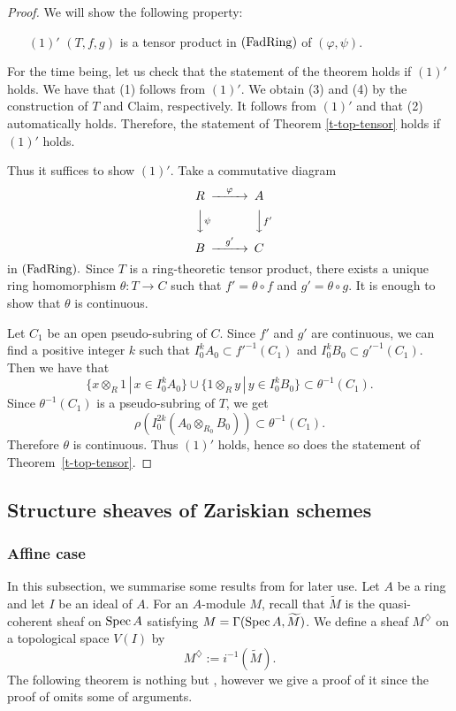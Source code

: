 \begin{proof}
We will show the following property: 
\begin{enumerate}
\item[$(1)'$] $(T, f, g)$ is a tensor product in $({\rm FadRing})$ of $(\varphi, \psi)$. 
\end{enumerate}

For the time being, 
let us check that the statement of the theorem holds if $(1)'$ holds. 
We have that (1) follows from $(1)'$. 
We obtain (3) and (4) by the construction of $T$ and Claim, respectively. 
It follows from $(1)'$ and \cite[Corollary 1.9(ii)]{Hub93} that (2) automatically holds. 
Therefore, the statement of Theorem \ref{t-top-tensor} holds if $(1)'$ holds. 

\medskip 

Thus it suffices to show $(1)'$. 
Take a commutative diagram 
$$\begin{CD}
R @>\varphi >> A\\
@VV\psi V @VVf'V\\
B @>g'>> C 
\end{CD}$$
in $({\rm FadRing}).$ 
Since $T$ is a ring-theoretic tensor product, 
there exists a unique ring homomorphism $\theta:T \to C$ 
such that $f'=\theta \circ f$ and $g'=\theta \circ g$. 
It is enough to show that $\theta$ is continuous. 

Let $C_1$ be an open pseudo-subring of $C$. 
Since $f'$ and $g'$ are continuous, 
we can find a positive integer $k$ such that 
$I_0^kA_0 \subset f'^{-1}(C_1)$ and $I_0^kB_0 \subset g'^{-1}(C_1)$. 
Then we have that 
$$\{x \otimes_R 1\,|\, x \in I_0^kA_0\} \cup 
\{1 \otimes_R y\,|\, y \in I_0^kB_0\} \subset \theta^{-1}(C_1).$$ 
Since $\theta^{-1}(C_1)$ is a pseudo-subring of $T$, 
we get 
$$\rho(I_0^{2k}(A_0 \otimes_{R_0} B_0)) \subset \theta^{-1}(C_1).$$ 
Therefore $\theta$ is continuous. 
Thus $(1)'$ holds, 
hence so does the statement of Theorem~\ref{t-top-tensor}. 
\end{proof}




\subsection{Structure sheaves of Zariskian schemes}

\subsubsection{Affine case}\label{ss-FK-affine}

In this subsection, we summarise some results from \cite{FK} for later use. 
Let $A$ be a ring and let $I$ be an ideal of $A$. 
For an $A$-module $M$, recall that $\widetilde M$ 
is the quasi-coherent sheaf on ${\operatorname{Spec}}\,A$ satisfying 
$M=\Gamma({\operatorname{Spec}}\,A, \widetilde M)$. 
We define a sheaf $M^{\diamondsuit}$ on a topological space $V(I)$ by 
$$M^{\diamondsuit}:=i^{-1}(\widetilde M).$$
The following theorem is nothing but \cite[Ch. I, Proposition B.1.4]{FK}, 
however we give a proof of it 
since the proof of \cite[Ch. I, Proposition B.1.4]{FK} omits some of arguments. 



